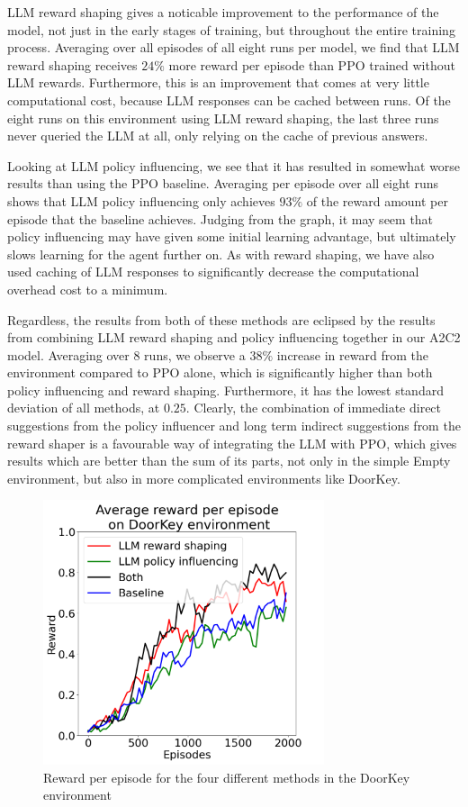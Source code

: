 \documentclass[conference]{IEEEtran}
\begin{document}
LLM reward shaping gives a noticable improvement to the performance of the model, not just in the early stages of training, but throughout the entire training process. Averaging over all episodes of all eight runs per model, we find that LLM reward shaping receives $24\%$ more reward per episode than PPO trained without LLM rewards. Furthermore, this is an improvement that comes at very little computational cost, because LLM responses can be cached between runs. Of the eight runs on this environment using LLM reward shaping, the last three runs never queried the LLM at all, only relying on the cache of previous answers.

Looking at LLM policy influencing, we see that it has resulted in somewhat worse results than using the PPO baseline. Averaging per episode over all eight runs shows that LLM policy influencing only achieves $93\%$ of the reward amount per episode that the baseline achieves. Judging from the graph, it may seem that policy influencing may have given some initial learning advantage, but ultimately slows learning for the agent further on. As with reward shaping, we have also used caching of LLM responses to significantly decrease the computational overhead cost to a minimum. 

Regardless, the results from both of these methods are eclipsed by the results from combining LLM reward shaping and policy influencing together in our A2C2 model. Averaging over 8 runs, we observe a $38\%$ increase in reward from the environment compared to PPO alone, which is significantly higher than both policy influencing and reward shaping. Furthermore, it has the lowest standard deviation of all methods, at $0.25$. Clearly, the combination of immediate direct suggestions from the policy influencer and long term indirect suggestions from the reward shaper is a favourable way of integrating the LLM with PPO, which gives results which are better than the sum of its parts, not only in the simple Empty environment, but also in more complicated environments like DoorKey.

\begin{figure}[h]
\centerline{\includegraphics[width=3.25in]{figure/doorkeyresults.png}}
\caption{Reward per episode for the four different methods in the DoorKey environment}
\label{doorkeyresults}
\end{figure}
\end{document}
